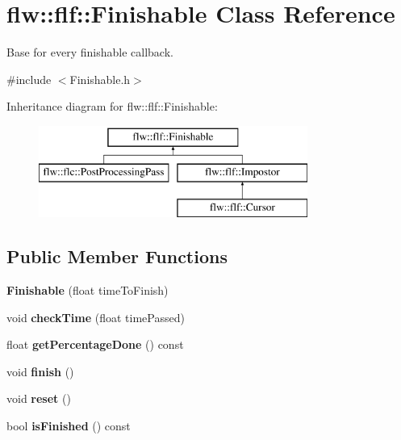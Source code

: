 \hypertarget{classflw_1_1flf_1_1Finishable}{}\section{flw\+:\+:flf\+:\+:Finishable Class Reference}
\label{classflw_1_1flf_1_1Finishable}


Base for every finishable callback.  




{\ttfamily \#include $<$Finishable.\+h$>$}

Inheritance diagram for flw\+:\+:flf\+:\+:Finishable\+:\begin{figure}[H]
\begin{center}
\leavevmode
\includegraphics[height=3.000000cm]{classflw_1_1flf_1_1Finishable}
\end{center}
\end{figure}
\subsection*{Public Member Functions}
\begin{DoxyCompactItemize}
\item 
\mbox{\label{classflw_1_1flf_1_1Finishable_a167dd981e22d9450aefdaf905cfae8bb}} 
{\bfseries Finishable} (float time\+To\+Finish)
\item 
\mbox{\label{classflw_1_1flf_1_1Finishable_af3a1125b567dcb2d5c0b4f3ce5246961}} 
void {\bfseries check\+Time} (float time\+Passed)
\item 
\mbox{\label{classflw_1_1flf_1_1Finishable_a298ade78c1c08c4832689ef8a09df3cc}} 
float {\bfseries get\+Percentage\+Done} () const
\item 
\mbox{\label{classflw_1_1flf_1_1Finishable_ae050528989ddef860d457264b014d869}} 
void {\bfseries finish} ()
\item 
\mbox{\label{classflw_1_1flf_1_1Finishable_a8f0662da7f8881ce02f9211ba68d4995}} 
void {\bfseries reset} ()
\item 
\mbox{\label{classflw_1_1flf_1_1Finishable_a4f5caae7c8be0f9b275fcc93ad9e5428}} 
bool {\bfseries is\+Finished} () const
\end{DoxyCompactItemize}
